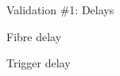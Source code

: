 \documentclass[xcolor=table]{beamer}
\begin{document}
\begin{frame}{Validation \#1: Delays}
\begin{minipage}{0.5\textwidth}
\noindent{}
\center Fibre delay
\end{minipage}%
\begin{minipage}{0.5\textwidth}
\noindent{}
\center Trigger delay
\end{minipage}
\end{frame}
\end{document}
